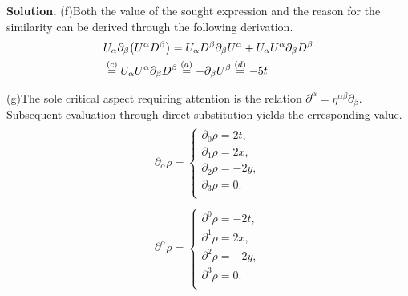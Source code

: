 \documentclass[12pt, a4paper, oneside]{article}
\newenvironment{solution}{\par\noindent\textbf{Solution. }}{\par}
\newcommand{\p}{\partial}
\begin{document}
\begin{solution}
    (f)Both the value of the sought expression and the reason for the similarity can be derived through the following derivation.
    \begin{equation}
        \begin{split}
            &U_\alpha\p_\beta\qty(U^\alpha D^\beta)=U_\alpha D^\beta\p_\beta U^\alpha + U_\alpha U^\alpha\p_\beta D^\beta\\
            &\overset{(c)}{=}U_\alpha U^\alpha\p_\beta D^\beta \overset{(a)}{=}-\p_\beta U^\beta \overset{(d)}{=}-5t
        \end{split}
    \end{equation}

    (g)The sole critical aspect requiring attention is the relation $\p^\alpha = \eta^{\alpha\beta}\p_\beta$. Subsequent evaluation through direct substitution yields the crresponding value.
    \begin{align}
        \begin{split}
            \p_\alpha\rho=
            \begin{cases}
                \p_0\rho=2t,\\
                \p_1\rho=2x,\\
                \p_2\rho=-2y,\\
                \p_3\rho=0.\\
            \end{cases}
        \end{split}\\
        \begin{split}
            \p^\alpha\rho=
            \begin{cases}
                \p^0\rho=-2t,\\
                \p^1\rho=2x,\\
                \p^2\rho=-2y,\\
                \p^3\rho=0.\\
            \end{cases}
        \end{split}
    \end{align}


\end{solution}
\end{document}
